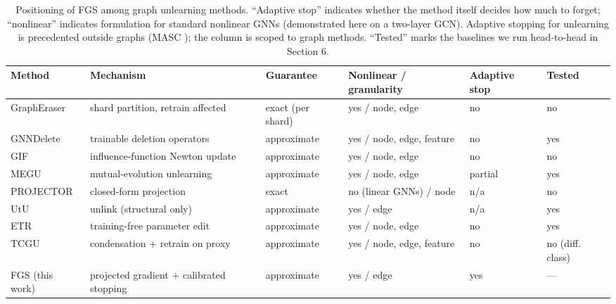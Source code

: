 \documentclass[pdflatex,sn-basic,Numbered]{sn-jnl}
\begin{document}
\begin{table}[htbp]\centering\scriptsize\setlength{\tabcolsep}{3pt}
\caption{Positioning of FGS among graph unlearning methods. ``Adaptive stop'' indicates whether the method itself decides how much to forget; ``nonlinear'' indicates formulation for standard nonlinear GNNs (demonstrated here on a two-layer GCN). Adaptive stopping for unlearning is precedented outside graphs (MASC \cite{masc2026}); the column is scoped to graph methods. ``Tested'' marks the baselines we run head-to-head in Section 6.}
\begin{tabular}{p{1.8cm}p{2.9cm}p{1.5cm}p{2.1cm}p{1.2cm}p{1.3cm}}\toprule
Method & Mechanism & Guarantee & Nonlinear / granularity & Adaptive stop & Tested\\\midrule
GraphEraser \cite{grapheraser2022} & shard partition, retrain affected & exact (per shard) & yes / node, edge & no & no\\
GNNDelete \cite{gnndelete2023} & trainable deletion operators & approximate & yes / node, edge, feature & no & yes\\
GIF \cite{gif2023} & influence-function Newton update & approximate & yes / node, edge & no & no\\
MEGU \cite{megu2024} & mutual-evolution unlearning & approximate & yes / node, edge & partial & yes\\
PROJECTOR \cite{projector2023} & closed-form projection & exact & no (linear GNNs) / node & n/a & no\\
UtU \cite{utu2024} & unlink (structural only) & approximate & yes / edge & n/a & yes\\
ETR \cite{etr2024} & training-free parameter edit & approximate & yes / node, edge & no & yes\\
TCGU \cite{tcgu2026} & condensation + retrain on proxy & approximate & yes / node, edge, feature & no & no (diff. class)\\
FGS (this work) & projected gradient + calibrated stopping & approximate & yes / edge & yes & ---\\\bottomrule
\end{tabular}\end{table}
\end{document}
